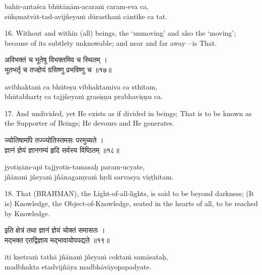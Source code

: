 \begin{transliteration}
bahir-antaśca bhūtānām-acaraṁ caram-eva ca, \\
sūkṣmatvāt-tad-avijñeyaṁ dūrasthaṁ cāntike ca tat.
\end{transliteration}

16. Without and within (all) beings, the `unmoving' and also the `moving';
because of its subtlety unknowable; and near and far away---is That.

\begin{gitaverse}
अविभक्तं च भूतेषु विभक्तमिव च स्थितम् । \\
भूतभर्तृ च तज्ज्ञेयं ग्रसिष्णु प्रभविष्णु च ॥१७॥
\end{gitaverse}

\begin{transliteration}
avibhaktaṁ ca bhūteṣu vibhaktamiva ca sthitam, \\
bhūtabhartṛ ca tajjñeyaṁ grasiṣṇu prabhaviṣṇu ca.
\end{transliteration}

17. And undivided, yet He exists as if divided in beings; That is to be known
as the Supporter of Beings; He devours and He generates.

\begin{gitaverse}
ज्योतिषामपि तज्ज्योतिस्तमसः परमुच्यते । \\
ज्ञानं ज्ञेयं ज्ञानगम्यं हृदि सर्वस्य विष्ठितम् ॥१८॥
\end{gitaverse}

\begin{transliteration}
jyotiṣām-api tajjyotis-tamasaḥ param-ucyate, \\
jñānaṁ jñeyaṁ jñānagamyaṁ hṛdi sarvasya viṣṭhitam.
\end{transliteration}

18. That (BRAHMAN), the Light-of-all-lights, is said to be beyond darkness; (It
is) Knowledge, the Object-of-Knowledge, seated in the hearts of all, to be
reached by Knowledge.

\begin{gitaverse}
इति क्षेत्रं तथा ज्ञानं ज्ञेयं चोक्तं समासतः । \\
मद्भक्त एतद्विज्ञाय मद्भावायोपपद्यते ॥१९॥
\end{gitaverse}

\begin{transliteration}
iti kṣetraṁ tathā jñānaṁ jñeyaṁ coktaṁ samāsataḥ, \\
madbhakta etadvijñāya madbhāvāyopapadyate.
\end{transliteration}

